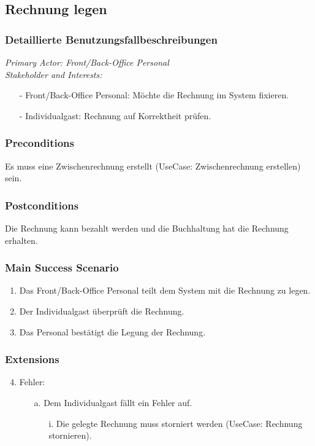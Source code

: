 \documentclass[./detailed_overview_usecases.tex]{subfiles}
\begin{document}
    \subsection{Rechnung legen}
    \subsubsection{Detaillierte Benutzungsfallbeschreibungen}
    \textit{Primary Actor: Front/Back-Office Personal}
    \\
    \textit{Stakeholder and Interests:}
    \begin{itemize}
        \item[-] Front/Back-Office Personal: Möchte die Rechnung im System fixieren.
		\item[-] Individualgast: Rechnung auf Korrektheit prüfen.
    \end{itemize}

    \subsubsection*{Preconditions}
    Es muss eine Zwischenrechnung erstellt (UseCase: Zwischenrechnung erstellen) sein.

    \subsubsection*{Postconditions}
    Die Rechnung kann bezahlt werden und die Buchhaltung hat die Rechnung erhalten.

    \subsubsection*{Main Success Scenario}
    \begin{enumerate}
        \item Das Front/Back-Office Personal teilt dem System mit die Rechnung zu legen.
        \item Der Individualgast überprüft die Rechnung.
        \item Das Personal bestätigt die Legung der Rechnung.
    \end{enumerate}

    \subsubsection*{Extensions}
    \begin{enumerate}
        \setcounter{enumi}{3}
        \item Fehler:
        \begin{itemize}
            \item[a.] Dem Individualgast fällt ein Fehler auf.
            \begin{itemize}
                \item[i.] Die gelegte Rechnung muss storniert werden (UseCase: Rechnung stornieren).
            \end{itemize}
        \end{itemize}
    \end{enumerate}
\end{document}
